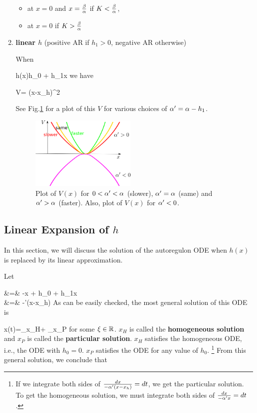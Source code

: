 \begin{enumerate}
\begin{itemize}[$\checkmark$]
\item at $x=0$ and $x=\frac{\beta}{\alpha}$ if $K<\frac{\beta}{\alpha}$,

\item at $x=0$ if $K>\frac{\beta}{\alpha}$

\end{itemize}


\item {\bf linear $h$} (positive AR if $h_1>0$,
negative AR otherwise)

When

\beq
h(x)\approx h_0 + h_1x
\eeq
we have

\beq
V= (x-x_h)^2
\eeq

See Fig.\ref{v-faster-same-slower}
for a plot of this $V$ for various 
choices of $\alpha'=\alpha-h_1$.

\begin{figure}[h!]
\centering
\includegraphics[width=2in]
{autoregulons/v-faster-same-slower.png}
\caption{Plot of $V(x)$ for 
$0<\alpha'<\alpha$ (slower),
$\alpha'=\alpha$ (same) and
$\alpha'>\alpha$ (faster).
Also, plot of $V(x)$ for $\alpha'<0$.}
\label{v-faster-same-slower}
\end{figure}
 
\end{enumerate}

\subsection{Linear Expansion of $h$}

In this section, we will
discuss the solution of
the autoregulon ODE
when $h(x)$ is replaced by
its linear approximation.

Let 

\beqa
{} &=& -\alp x + h_0 + h_1x
\\
&=& -\alp'(x-x_h)
\eeqa
As can be easily checked, the
 most general solution of this ODE is

\beq
x(t)=_{x_H}+
_{x_P}
\eeq
for some $\xi\in{ \mathbb{R}}$.
$x_H$ is called the {\bf homogeneous solution}
and $x_P$ is called the {\bf particular solution}.
$x_H$ satisfies the homogeneous ODE, i.e., the
ODE with $h_0=0$. $x_P$ satisfies the ODE for any 
value of $h_0$.
\footnote{
If we integrate both sides of
$\frac{dx}{-\alpha' (x-x_h)}=dt$,
we get the particular solution.
To get the homogeneous 
solution,
we must integrate both sides
of $\frac{dx}{-\alpha' x}=dt$.}
From this general solution, we conclude that

